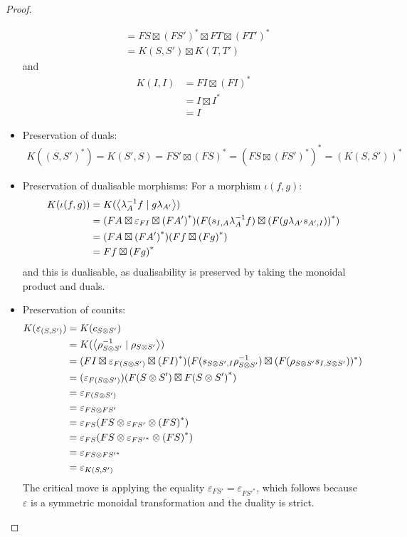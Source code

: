 \documentclass[11pt,letterpaper]{article}
\theoremstyle{plain}
\theoremstyle{definition}
\newcommand{\teletimes}{\mathbin{\boxtimes}}
\newcommand{\rep}[2]{{\ensuremath \left\langle #1 \mid #2 \right\rangle}}
\newcommand{\todo}[1]{\textcolor{red}{\small #1}}
\begin{document}
\begin{proof}
\begin{itemize}
\begin{align*}
&= FS \teletimes {(FS')}^* \teletimes FT \teletimes {(FT')}^* \\
&= K(S, S') \teletimes K(T, T')
\end{align*}
and
\begin{align*}
K(I, I)
&= FI \teletimes {(FI)}^* \\
&= I \teletimes I^* \\
&= I
\end{align*}
\item Preservation of duals:
\begin{align*}
K({(S, S')}^*)
= K(S', S)
= FS' \teletimes {(FS)}^*
= {(FS \teletimes {(FS')}^*)}^*
= {(K(S, S'))}^*
\end{align*}

\item Preservation of dualisable morphisms:  For a morphism $\iota(f, g)$:
\begin{align*}
K(\iota(f, g))
    &= K(\rep{\lambda_A^{-1} f}{g \lambda_{A'}}) \\
    &= (FA \teletimes \varepsilon_{FI} \teletimes {(FA')}^*)(F(s_{I,A}\lambda_A^{-1} f) \teletimes {(F(g \lambda_{A'}s_{A', I}))}^* ) \\
    &= (FA \teletimes {(FA')}^*)(Ff \teletimes {(Fg)}^* ) \\
    &= Ff \teletimes {(Fg)}^*
\end{align*}
and this is dualisable, as dualisability is preserved by taking the monoidal product and duals.
\item Preservation of counits:
\begin{align*}
K(\varepsilon_{(S, S')})
&= K(c_{S \otimes S'}) \\
&= K(\rep{\rho_{S \otimes S'}^{-1}}{\rho_{S \otimes S'}}) \\
&= (FI \teletimes \varepsilon_{F(S \otimes S')} \teletimes {(FI)}^*)(F(s_{S \otimes S',I}\rho_{S \otimes S'}^{-1}) \teletimes (F(\rho_{S \otimes S'} s_{I, S \otimes S'}))^* ) \\
&= (\varepsilon_{F(S \otimes S')})(F(S \otimes S') \teletimes F{(S \otimes S')}^* ) \\
&= \varepsilon_{F(S \otimes S')} \\
&= \varepsilon_{FS \otimes FS'} \\
&= \varepsilon_{FS}(FS \otimes \varepsilon_{FS'} \otimes {(FS)}^*) \\
&= \varepsilon_{FS}(FS \otimes \varepsilon_{{FS'}^*} \otimes {(FS)}^*) \\
&= \varepsilon_{FS \otimes {FS'}^*} \\
&= \varepsilon_{K(S, S')}
\end{align*}
The critical move is applying the equality $\varepsilon_{FS'} = \varepsilon_{{FS'}^*}$, which follows because $\varepsilon$ is a symmetric monoidal transformation and the duality is strict.
\end{itemize}


\end{proof}
\end{document}
